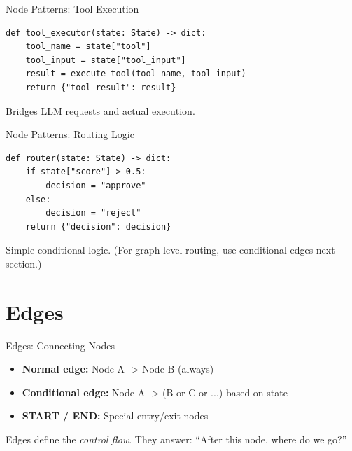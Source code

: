 \documentclass[aspectratio=169,11pt]{beamer}
\begin{document}
\begin{frame}[fragile,t]{Node Patterns: Tool Execution}
\vspace{0.05cm}

\begin{codebox}
\begin{lstlisting}
def tool_executor(state: State) -> dict:
    tool_name = state["tool"]
    tool_input = state["tool_input"]
    result = execute_tool(tool_name, tool_input)
    return {"tool_result": result}
\end{lstlisting}
\end{codebox}

\vspace{0.1cm}

{\footnotesize Bridges LLM requests and actual execution.}
\end{frame}

\begin{frame}[fragile,t]{Node Patterns: Routing Logic}
\vspace{0.05cm}

\begin{codebox}
\begin{lstlisting}
def router(state: State) -> dict:
    if state["score"] > 0.5:
        decision = "approve"
    else:
        decision = "reject"
    return {"decision": decision}
\end{lstlisting}
\end{codebox}

\vspace{0.1cm}

{\footnotesize Simple conditional logic. (For graph-level routing, use conditional edges-next section.)}
\end{frame}

\section{Edges}
\begin{frame}[t]{Edges: Connecting Nodes}
\setlength{\itemsep}{1pt}
\vspace{0.1cm}

\begin{conceptbox}
\setlength{\itemsep}{1pt}
\begin{itemize}
  \item \textbf{Normal edge:} Node A -> Node B (always)
  \item \textbf{Conditional edge:} Node A -> (B or C or ...) based on state
  \item \textbf{START / END:} Special entry/exit nodes
\end{itemize}
\end{conceptbox}

\vspace{0.15cm}

Edges define the \textit{control flow}. They answer: ``After this node, where do we go?''
\end{frame}
\end{document}
